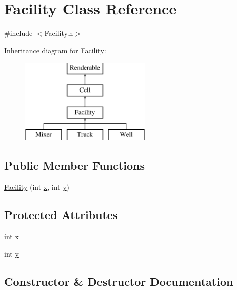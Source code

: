 \hypertarget{classFacility}{}\section{Facility Class Reference}
\label{classFacility}


{\ttfamily \#include $<$Facility.\+h$>$}

Inheritance diagram for Facility\+:\begin{figure}[H]
\begin{center}
\leavevmode
\includegraphics[height=4.000000cm]{classFacility}
\end{center}
\end{figure}
\subsection*{Public Member Functions}
\begin{DoxyCompactItemize}
\item 
\mbox{\hyperlink{classFacility_aca76f1d74522884d7c9cfc742db5b9e3}{Facility}} (int \mbox{\hyperlink{classFacility_a97a4d1f6f807e0e74c4283cf120daed9}{x}}, int \mbox{\hyperlink{classFacility_a28d1fbfe0699e800db094161504b0e44}{y}})
\end{DoxyCompactItemize}
\subsection*{Protected Attributes}
\begin{DoxyCompactItemize}
\item 
int \mbox{\hyperlink{classFacility_a97a4d1f6f807e0e74c4283cf120daed9}{x}}
\item 
int \mbox{\hyperlink{classFacility_a28d1fbfe0699e800db094161504b0e44}{y}}
\end{DoxyCompactItemize}


\subsection{Constructor \& Destructor Documentation}
\mbox{\label{classFacility_aca76f1d74522884d7c9cfc742db5b9e3}} 
